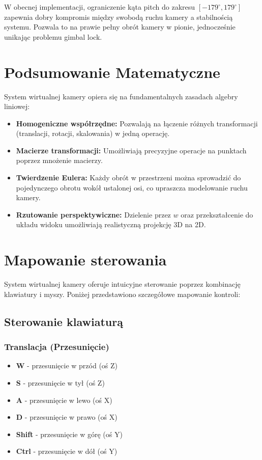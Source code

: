 \documentclass[a4paper,12pt]{article}
\begin{document}
W obecnej implementacji, ograniczenie kąta pitch do zakresu \([-179^\circ, 179^\circ]\) zapewnia dobry kompromis między swobodą ruchu kamery a stabilnością systemu. Pozwala to na prawie pełny obrót kamery w pionie, jednocześnie unikając problemu gimbal lock.

\section{Podsumowanie Matematyczne}

System wirtualnej kamery opiera się na fundamentalnych zasadach algebry liniowej:
\begin{itemize}
    \item \textbf{Homogeniczne współrzędne:} Pozwalają na łączenie różnych transformacji (translacji, rotacji, skalowania) w jedną operację.
    \item \textbf{Macierze transformacji:} Umożliwiają precyzyjne operacje na punktach poprzez mnożenie macierzy.
    \item \textbf{Twierdzenie Eulera:} Każdy obrót w przestrzeni można sprowadzić do pojedynczego obrotu wokół ustalonej osi, co upraszcza modelowanie ruchu kamery.
    \item \textbf{Rzutowanie perspektywiczne:} Dzielenie przez \(w\) oraz przekształcenie do układu widoku umożliwiają realistyczną projekcję 3D na 2D.
\end{itemize}

\section{Mapowanie sterowania}

System wirtualnej kamery oferuje intuicyjne sterowanie poprzez kombinację klawiatury i myszy. Poniżej przedstawiono szczegółowe mapowanie kontroli:

\subsection{Sterowanie klawiaturą}

\subsubsection{Translacja (Przesunięcie)}
\begin{itemize}
    \item \textbf{W} - przesunięcie w przód (oś Z)
    \item \textbf{S} - przesunięcie w tył (oś Z)
    \item \textbf{A} - przesunięcie w lewo (oś X)
    \item \textbf{D} - przesunięcie w prawo (oś X)
    \item \textbf{Shift} - przesunięcie w górę (oś Y)
    \item \textbf{Ctrl} - przesunięcie w dół (oś Y)
\end{itemize}
\end{document}
